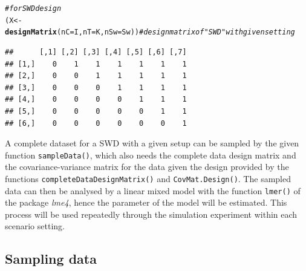 \documentclass{article}\usepackage[]{graphicx}\usepackage[]{color}
\makeatletter
\newcommand{\hlcom}[1]{\textcolor[rgb]{0.678,0.584,0.686}{\textit{#1}}}%
\newcommand{\hlstd}[1]{\textcolor[rgb]{0.345,0.345,0.345}{#1}}%
\newcommand{\hlkwb}[1]{\textcolor[rgb]{0.69,0.353,0.396}{#1}}%
\newcommand{\hlkwc}[1]{\textcolor[rgb]{0.333,0.667,0.333}{#1}}%
\newcommand{\hlkwd}[1]{\textcolor[rgb]{0.737,0.353,0.396}{\textbf{#1}}}%
\newenvironment{kframe}{%
 \def\at@end@of@kframe{}%
 \ifinner\ifhmode%
  \def\at@end@of@kframe{\end{minipage}}%
  \begin{minipage}{\columnwidth}%
 \fi\fi%
 \def\FrameCommand##1{\hskip\@totalleftmargin \hskip-\fboxsep
 \colorbox{shadecolor}{##1}\hskip-\fboxsep
     \hskip-\linewidth \hskip-\@totalleftmargin \hskip\columnwidth}%
 \MakeFramed {\advance\hsize-\width
   \@totalleftmargin\z@ \linewidth\hsize
   \@setminipage}}%
 {\par\unskip\endMakeFramed%
 \at@end@of@kframe}
\newenvironment{knitrout}{}{} %
\newcommand{\Rfunction}[1]{{\texttt{#1}}}
\newcommand{\Rpackage}[1]{{\textit{#1}}}
\makeatother
\begin{document}
\begin{knitrout}
\color{fgcolor}\begin{kframe}
\begin{alltt}
\hlcom{#for SWD design}
\hlstd{(X}\hlkwb{<-}\hlkwd{designMatrix}\hlstd{(}\hlkwc{nC}\hlstd{=I,} \hlkwc{nT}\hlstd{=K,} \hlkwc{nSw}\hlstd{=Sw))} \hlcom{#design matrix of "SWD" with given setting}
\end{alltt}
\begin{verbatim}
##      [,1] [,2] [,3] [,4] [,5] [,6] [,7]
## [1,]    0    1    1    1    1    1    1
## [2,]    0    0    1    1    1    1    1
## [3,]    0    0    0    1    1    1    1
## [4,]    0    0    0    0    1    1    1
## [5,]    0    0    0    0    0    1    1
## [6,]    0    0    0    0    0    0    1
\end{verbatim}
\end{kframe}
\end{knitrout}

A complete dataset for a SWD with a given setup can be sampled by the given function \Rfunction{sampleData()}, which also needs the complete data design matrix and the covariance-variance matrix for the data given the design provided by the functions 
\Rfunction{completeDataDesignMatrix()} and \Rfunction{CovMat.Design()}. The sampled data can then be analysed by a linear mixed model with the function \Rfunction{lmer()} of the package \Rpackage{lme4}, hence the parameter of the model will be estimated. 
This process will be used repeatedly through the simulation experiment within each scenario setting.

\subsection{Sampling data}
\end{document}
